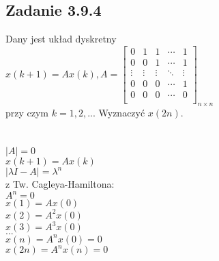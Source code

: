 \subsection*{Zadanie 3.9.4} {\color{darkgray}
	Dany jest układ dyskretny\\
	$x(k+1)=Ax(k), A=\left[ \begin{array}{ccccc}   
		 0&1&1&\cdots&1 \\
		 0&0&1&\cdots&1  \\
		 \vdots&\vdots&\vdots&\ddots&\vdots  \\
		 0&0&0&\cdots&1  \\
		 0&0&0&\cdots&0  \\
	\end{array}\right]_{n \times n}$\\
	przy czym $k=1,2,...$ Wyznaczyć $x(2n)$.\\
}\lineh
\\\\
$|A|=0$\\
$x(k+1)=Ax(k)$\\
$|\lambda I -A|=\lambda^n$\\
z Tw. Cagleya-Hamiltona:\\
$A^n=0$\\
$x(1)=Ax(0)$\\
$x(2)=A^2x(0)$\\
$x(3)=A^3x(0)$\\
$...$\\
$x(n)=A^nx(0)=0$\\
$x(2n)=A^nx(n)=0$\\